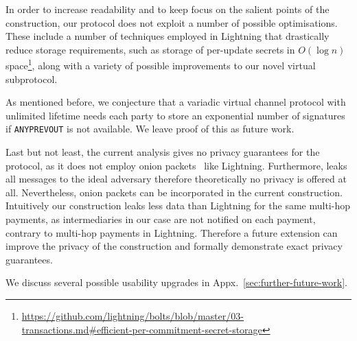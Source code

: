   In order to increase readability and to keep focus on the salient points of
  the construction, our protocol does not exploit a number of possible
  optimisations. These include a number of techniques employed in Lightning that
  drastically reduce storage requirements, such as storage of per-update secrets
  in $O(\log n)$
  space\footnote{\url{https://github.com/lightning/bolts/blob/master/03-transactions.md\#efficient-per-commitment-secret-storage}},
  along with a variety of possible improvements to our novel virtual
  subprotocol.

  As mentioned before, we conjecture that a variadic virtual
  channel protocol with unlimited lifetime needs each party to store an
  exponential number of signatures if \texttt{ANYPREVOUT} is not available. We
  leave proof of this as future work.

  Last but not least, the current analysis gives no privacy guarantees for the
  protocol, as it does not employ onion packets~\cite{sphinx} like Lightning.
  Furthermore, \fchan leaks all messages to the ideal adversary therefore
  theoretically no privacy is offered at all. Nevertheless, onion packets can be
  incorporated in the current construction. Intuitively our construction
  leaks less data than Lightning for the same multi-hop payments, as
  intermediaries in our case are not notified on each payment, contrary to
  multi-hop payments in Lightning. Therefore a future extension can improve the
  privacy of the construction and formally demonstrate exact privacy guarantees.

  We discuss several possible usability upgrades in
  Appx.~\ref{sec:further-future-work}.
